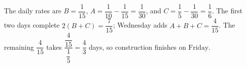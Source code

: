 The daily rates are $B=\dfrac{1}{15}$, $A=\dfrac{1}{10}-\dfrac{1}{15}=\dfrac{1}{30}$, and $C=\dfrac{1}{5}-\dfrac{1}{30}=\dfrac{1}{6}$. The first two days complete $2(B+C)=\dfrac{7}{15}$; Wednesday adds $A+B+C=\dfrac{4}{15}$. The remaining $\dfrac{4}{15}$ takes $\dfrac{\dfrac{4}{15}}{\dfrac{1}{5}}=\dfrac{4}{3}$ days, so construction finishes on $\boxed{\text{Friday}}$.
